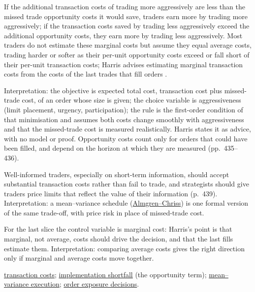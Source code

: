 \begin{qfmethod}\label{meth:aggressiveness-tradeoff}
 If the additional transaction costs of trading more aggressively are less than the missed trade opportunity costs it would save, traders earn more by trading more aggressively; if the transaction costs saved by trading less aggressively exceed the additional opportunity costs, they earn more by trading less aggressively. Most traders do not estimate these marginal costs but assume they equal average costs, trading harder or softer as their per-unit opportunity costs exceed or fall short of their per-unit transaction costs; Harris advises estimating marginal transaction costs from the costs of the last trades that fill orders \citep[chap.~``Liquidity and Transaction Cost Measurement'', sec.~21.6, pp.~437--438]{alpha-harris}.

 Interpretation: the objective is expected total cost, transaction cost plus missed-trade cost, of an order whose size is given; the choice variable is aggressiveness (limit placement, urgency, participation); the rule is the first-order condition of that minimisation and assumes both costs change smoothly with aggressiveness and that the missed-trade cost is measured realistically. Harris states it as advice, with no model or proof. Opportunity costs count only for orders that could have been filled, and depend on the horizon at which they are measured (pp.~435--436).

 Well-informed traders, especially on short-term information, should accept substantial transaction costs rather than fail to trade, and strategists should give traders price limits that reflect the value of their information (p.~439). Interpretation: a mean--variance schedule (\hyperref[mod:almgren-chriss-execution]{Almgren--Chriss}) is one formal version of the same trade-off, with price risk in place of missed-trade cost.

 For the last slice the control variable is marginal cost: Harris's point is that marginal, not average, costs should drive the decision, and that the last fills estimate them. Interpretation: comparing average costs gives the right direction only if marginal and average costs move together.

 \hyperref[def:transaction-costs]{transaction costs}; \hyperref[def:implementation-shortfall]{implementation shortfall} (the opportunity term); \hyperref[mod:almgren-chriss-execution]{mean--variance execution}; \hyperref[def:order-exposure-decisions]{order exposure decisions}.

\end{qfmethod}
